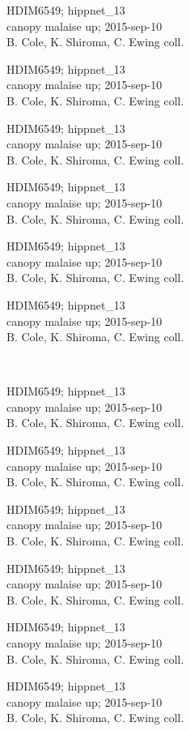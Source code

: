 \documentclass[2pt]{extarticle}
\begin{document}
\noindent
\parbox{0.16\textwidth}{\tiny \raggedright \rule[-0.3\baselineskip]{0pt}{10pt}HDIM6549; hippnet\_13\\ canopy malaise up; 2015-sep-10\\ B. Cole, K. Shiroma, C. Ewing coll.}
\parbox{0.16\textwidth}{\tiny \raggedright \rule[-0.3\baselineskip]{0pt}{10pt}HDIM6549; hippnet\_13\\ canopy malaise up; 2015-sep-10\\ B. Cole, K. Shiroma, C. Ewing coll.}
\parbox{0.16\textwidth}{\tiny \raggedright \rule[-0.3\baselineskip]{0pt}{10pt}HDIM6549; hippnet\_13\\ canopy malaise up; 2015-sep-10\\ B. Cole, K. Shiroma, C. Ewing coll.}
\parbox{0.16\textwidth}{\tiny \raggedright \rule[-0.3\baselineskip]{0pt}{10pt}HDIM6549; hippnet\_13\\ canopy malaise up; 2015-sep-10\\ B. Cole, K. Shiroma, C. Ewing coll.}
\parbox{0.16\textwidth}{\tiny \raggedright \rule[-0.3\baselineskip]{0pt}{10pt}HDIM6549; hippnet\_13\\ canopy malaise up; 2015-sep-10\\ B. Cole, K. Shiroma, C. Ewing coll.}
\parbox{0.16\textwidth}{\tiny \raggedright \rule[-0.3\baselineskip]{0pt}{10pt}HDIM6549; hippnet\_13\\ canopy malaise up; 2015-sep-10\\ B. Cole, K. Shiroma, C. Ewing coll.} \\ 
\vspace{0.001in} 

\noindent
\parbox{0.16\textwidth}{\tiny \raggedright \rule[-0.3\baselineskip]{0pt}{10pt}HDIM6549; hippnet\_13\\ canopy malaise up; 2015-sep-10\\ B. Cole, K. Shiroma, C. Ewing coll.}
\parbox{0.16\textwidth}{\tiny \raggedright \rule[-0.3\baselineskip]{0pt}{10pt}HDIM6549; hippnet\_13\\ canopy malaise up; 2015-sep-10\\ B. Cole, K. Shiroma, C. Ewing coll.}
\parbox{0.16\textwidth}{\tiny \raggedright \rule[-0.3\baselineskip]{0pt}{10pt}HDIM6549; hippnet\_13\\ canopy malaise up; 2015-sep-10\\ B. Cole, K. Shiroma, C. Ewing coll.}
\parbox{0.16\textwidth}{\tiny \raggedright \rule[-0.3\baselineskip]{0pt}{10pt}HDIM6549; hippnet\_13\\ canopy malaise up; 2015-sep-10\\ B. Cole, K. Shiroma, C. Ewing coll.}
\parbox{0.16\textwidth}{\tiny \raggedright \rule[-0.3\baselineskip]{0pt}{10pt}HDIM6549; hippnet\_13\\ canopy malaise up; 2015-sep-10\\ B. Cole, K. Shiroma, C. Ewing coll.}
\parbox{0.16\textwidth}{\tiny \raggedright \rule[-0.3\baselineskip]{0pt}{10pt}HDIM6549; hippnet\_13\\ canopy malaise up; 2015-sep-10\\ B. Cole, K. Shiroma, C. Ewing coll.} \\ 
\vspace{0.001in} 
\end{document}
